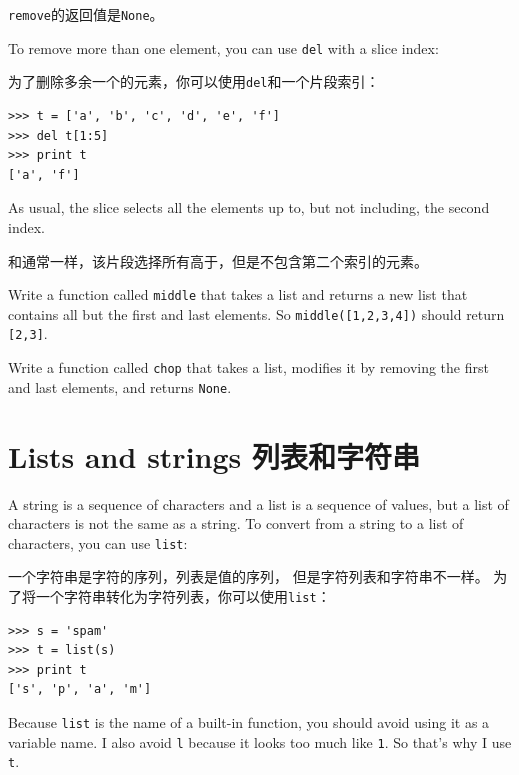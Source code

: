 \documentclass[10pt]{book}
\begin{document}
\begin{CJK}{UTF8}{gbsn}
{\tt remove}的返回值是{\tt None}。

To remove more than one element, you can use {\tt del} with
a slice index:

为了删除多余一个的元素，你可以使用{\tt del}和一个片段索引：

\begin{verbatim}
>>> t = ['a', 'b', 'c', 'd', 'e', 'f']
>>> del t[1:5]
>>> print t
['a', 'f']
\end{verbatim}
%
As usual, the slice selects all the elements up to, but not
including, the second index.

和通常一样，该片段选择所有高于，但是不包含第二个索引的元素。

\begin{exercise}

Write a function called \verb"middle" that takes a list and
returns a new list that contains all but the first and last
elements.  So \verb"middle([1,2,3,4])" should return \verb"[2,3]".

\end{exercise}

\begin{exercise}

Write a function called \verb"chop" that takes a list, modifies it
by removing the first and last elements, and returns {\tt None}.

\end{exercise}


\section{Lists and strings 列表和字符串}

A string is a sequence of characters and a list is a sequence
of values, but a list of characters is not the same as a
string.  To convert from a string to a list of characters,
you can use {\tt list}:

一个字符串是字符的序列，列表是值的序列，
但是字符列表和字符串不一样。
为了将一个字符串转化为字符列表，你可以使用{\tt list}：

\begin{verbatim}
>>> s = 'spam'
>>> t = list(s)
>>> print t
['s', 'p', 'a', 'm']
\end{verbatim}
%
Because {\tt list} is the name of a built-in function, you should
avoid using it as a variable name.  I also avoid {\tt l} because
it looks too much like {\tt 1}.  So that's why I use {\tt t}.


\end{CJK}
\end{document}
